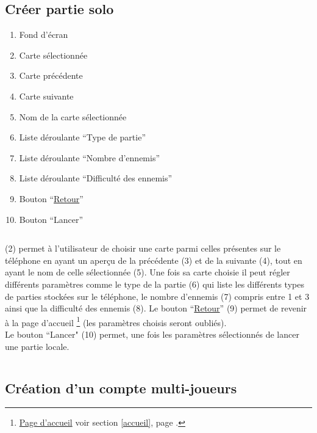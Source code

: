 \documentclass{report}
\begin{document}
		$\,$
	
\newpage

	\subsection{Créer partie solo}
	
		\hypertarget{Creer partie solo}{}
		\label{Creer partie solo}
	
		
		
		\begin{enumerate}
		  \item Fond d'écran
		  \item Carte sélectionnée
		  \item Carte précédente
		  \item Carte suivante
		  \item Nom de la carte sélectionnée
		  \item Liste déroulante ``Type de partie''
		  \item Liste déroulante ``Nombre d'ennemis''
		  \item Liste déroulante ``Difficulté des ennemis''
		  \item Bouton ``\hyperlink{Page d'accueil}{Retour}''
		  \item Bouton ``Lancer'' 
		\end{enumerate}
		
		$\,$
		
		(2) permet à l'utilisateur de choisir une carte parmi celles présentes sur le
		téléphone en ayant un aperçu de la précédente (3) et de la suivante (4), tout
		en ayant le nom de celle sélectionnée (5). Une fois sa carte choisie il peut 
		régler différents paramètres comme le type de la partie (6) qui liste les
		différents types de parties stockées sur le téléphone, le nombre d'ennemis (7)
		compris entre 1 et 3 ainsi que la difficulté des ennemis (8).
		Le bouton ``\hyperlink{Page d'accueil}{Retour}'' (9) permet de revenir à la page d'accueil%
		\footnote[1]{
			\hyperlink{Page d'accueil}{Page d'accueil}
			\og voir section \ref{accueil}, page \pageref{accueil}.\fg
		}
		(les paramètres choisis seront oubliés).\\
		Le bouton ``Lancer" (10) permet, une fois les paramètres sélectionnés de
		lancer une partie locale.
		
		$\,$
	
\newpage

	\subsection{Création d'un compte multi-joueurs}
	
\end{document}
